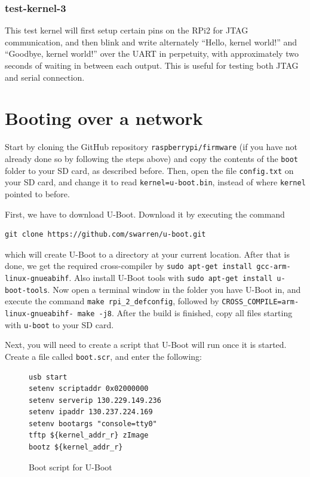 \documentclass[a4paper,11pt,reqno]{amsart}
\begin{document}
{\subsubsection{test-kernel-3}
This test kernel will first setup certain pins on the RPi2 for JTAG communication, and then blink and write alternately ``Hello, kernel world!'' and ``Goodbye, kernel world!'' over the UART in perpetuity, with approximately two seconds of waiting in between each output. This is useful for testing both JTAG and serial connection.

\section{Booting over a network}
Start by cloning the GitHub repository \texttt{raspberrypi/firmware} (if you have not already done so by following the steps above) and copy the contents of the \texttt{boot} folder to your SD card, as described before. Then, open the file \texttt{config.txt} on your SD card, and change it to read \texttt{kernel=u-boot.bin}, instead of where \texttt{kernel} pointed to before.

First, we have to download U-Boot. Download it by executing the command

\begin{verbatim}
git clone https://github.com/swarren/u-boot.git
\end{verbatim}

which will create U-Boot to a directory at your current location. After that is done, we get the required cross-compiler by \texttt{sudo apt-get install gcc-arm-linux-gnueabihf}. Also install U-Boot tools with \texttt{sudo apt-get install u-boot-tools}. Now open a terminal window in the folder you have U-Boot in, and execute the command \texttt{make rpi\_2\_defconfig}, followed by \texttt{CROSS\_COMPILE=arm-linux-gnueabihf- make -j8}. After the build is finished, copy all files starting with \texttt{u-boot} to your SD card.

Next, you will need to create a script that U-Boot will run once it is started. Create a file called \texttt{boot.scr}, and enter the following:

\begin{figure}[hb]
\begin{center}
\begin{BVerbatim}
usb start
setenv scriptaddr 0x02000000
setenv serverip 130.229.149.236
setenv ipaddr 130.237.224.169
setenv bootargs "console=tty0"
tftp ${kernel_addr_r} zImage
bootz ${kernel_addr_r}
\end{BVerbatim}
\end{center}
\caption{Boot script for U-Boot}
\label{fig:boots}
\end{figure}

}
\end{document}
